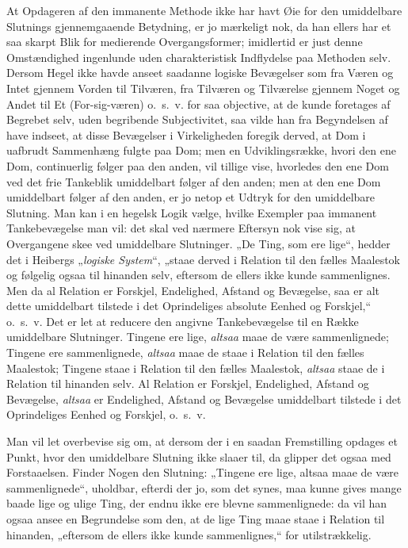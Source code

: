\documentclass[12pt]{book}
\newcommand{\opage}[1]{\marginnote{\footnotesize\textit{[#1]}}}
\begin{document}
At Opdageren af den immanente Methode ikke har havt
Øie for den umiddelbare Slutnings gjennemgaaende Betydning,
er jo mærkeligt nok, da han ellers har et saa skarpt
Blik for medierende Overgangsformer; imidlertid er just denne
Omstændighed ingenlunde uden charakteristisk Indflydelse paa
Methoden selv. Dersom Hegel ikke havde anseet saadanne
logiske Bevægelser som fra Væren og Intet gjennem Vorden
til Tilværen, fra Tilværen og Tilværelse gjennem Noget og
Andet til Et (For-sig-væren) o.~s.~v. for saa objective, at de
kunde foretages af Begrebet selv, uden begribende Subjectivitet,
saa vilde han fra Begyndelsen af have indseet, at disse Bevægelser
i Virkeligheden foregik derved, at Dom i uafbrudt Sammenhæng
fulgte paa Dom; men en Udviklingsrække, hvori den
\opage{297}ene Dom, continuerlig følger paa den anden, vil tillige vise,
hvorledes den ene Dom ved det frie Tankeblik umiddelbart
følger af den anden; men at den ene Dom umiddelbart
følger af den anden, er jo netop et Udtryk for den umiddelbare
Slutning. Man kan i en hegelsk Logik vælge, hvilke
Exempler paa immanent Tankebevægelse man vil: det skal
ved nærmere Eftersyn nok vise sig, at Overgangene skee ved
umiddelbare Slutninger. „De Ting, som ere lige“, hedder
det i Heibergs „\emph{logiske System}“, „staae derved i Relation
til den fælles Maalestok og følgelig ogsaa til hinanden selv,
eftersom de ellers ikke kunde sammenlignes. Men da al Relation
er Forskjel, Endelighed, Afstand og Bevægelse, saa er
alt dette umiddelbart tilstede i det Oprindeliges absolute Eenhed
og Forskjel,“ o.~s.~v. Det er let at reducere den angivne
Tankebevægelse til en Række umiddelbare Slutninger. Tingene
ere lige, \emph{altsaa} maae de være sammenlignede; Tingene ere
sammenlignede, \emph{altsaa} maae de staae i Relation til den fælles
Maalestok; Tingene staae i Relation til den fælles Maalestok,
\emph{altsaa} staae de i Relation til hinanden selv. Al Relation
er Forskjel, Endelighed, Afstand og Bevægelse, \emph{altsaa} er Endelighed,
Afstand og Bevægelse umiddelbart tilstede i det Oprindeliges
Eenhed og Forskjel, o.~s.~v.

Man vil let overbevise sig om, at dersom der i en saadan
Fremstilling opdages et Punkt, hvor den umiddelbare
Slutning ikke slaaer til, da glipper det ogsaa med Forstaaelsen.
Finder Nogen den Slutning: „Tingene ere lige, altsaa maae
de være sammenlignede“, uholdbar, efterdi der jo, som det
synes, maa kunne gives mange baade lige og ulige Ting, der
endnu ikke ere blevne sammenlignede: da vil han ogsaa ansee
en Begrundelse som den, at de lige Ting maae staae i Relation
til hinanden, „eftersom de ellers ikke kunde sammenlignes,“
for utilstrækkelig.
\end{document}
